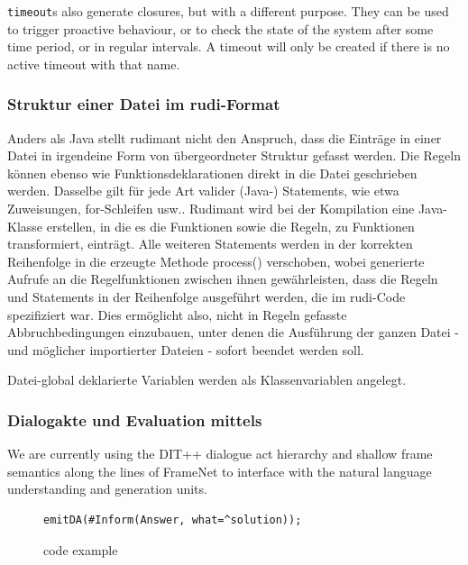 \texttt{timeout}s also generate closures, but with a different purpose. They
can be used to trigger proactive behaviour, or to check the state of the system
after some time period, or in regular intervals. A timeout will only be created
if there is no active timeout with that name.

\subsubsection{Struktur einer Datei im rudi-Format}

Anders als Java stellt rudimant nicht den Anspruch, dass die Einträge in einer
Datei in irgendeine Form von übergeordneter Struktur gefasst werden. Die Regeln
können ebenso wie Funktionsdeklarationen direkt in die Datei geschrieben
werden. Dasselbe gilt für jede Art valider (Java-) Statements, wie etwa
Zuweisungen, for-Schleifen usw.. Rudimant wird bei der Kompilation eine
Java-Klasse erstellen, in die es die Funktionen sowie die Regeln, zu Funktionen
transformiert, einträgt. Alle weiteren Statements werden in der korrekten
Reihenfolge in die erzeugte Methode process() verschoben, wobei generierte
Aufrufe an die Regelfunktionen zwischen ihnen gewährleisten, dass die Regeln
und Statements in der Reihenfolge ausgeführt werden, die im rudi-Code
spezifiziert war. Dies ermöglicht also, nicht in Regeln gefasste
Abbruchbedingungen einzubauen, unter denen die Ausführung der ganzen Datei -
und möglicher importierter Dateien - sofort beendet werden soll.

Datei-global deklarierte Variablen werden als Klassenvariablen angelegt.

\subsubsection{Dialogakte und Evaluation mittels \caret}
\label{sec:caret}

We are currently using the DIT++ dialogue act hierarchy \citep{bunt2012iso} and
shallow frame semantics along the lines of FrameNet
\citep{ruppenhofer2016framenet} to interface with the natural language
understanding and generation units.

\begin{figure}[htb]
  \centering\small%
\begin{verbatim}
emitDA(#Inform(Answer, what=^solution));
\end{verbatim}\vspace*{-3ex}
  \caption{\vonda code example}
  \label{fig:DA}
\end{figure}

